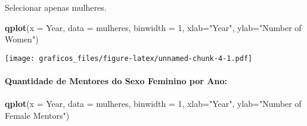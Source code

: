 \documentclass[
]{article}
\newenvironment{Shaded}{\begin{snugshade}}{\end{snugshade}}
\newcommand{\DataTypeTok}[1]{\textcolor[rgb]{0.13,0.29,0.53}{#1}}
\newcommand{\DecValTok}[1]{\textcolor[rgb]{0.00,0.00,0.81}{#1}}
\newcommand{\KeywordTok}[1]{\textcolor[rgb]{0.13,0.29,0.53}{\textbf{#1}}}
\newcommand{\NormalTok}[1]{#1}
\newcommand{\OperatorTok}[1]{\textcolor[rgb]{0.81,0.36,0.00}{\textbf{#1}}}
\newcommand{\StringTok}[1]{\textcolor[rgb]{0.31,0.60,0.02}{#1}}
\begin{document}
Selecionar apenas mulheres.

\begin{Shaded}
\end{Shaded}

\begin{Shaded}
\begin{Highlighting}[]
\KeywordTok{qplot}\NormalTok{(}\DataTypeTok{x =}\NormalTok{ Year, }\DataTypeTok{data =}\NormalTok{ mulheres, }\DataTypeTok{binwidth =} \DecValTok{1}\NormalTok{, }\DataTypeTok{xlab=}\StringTok{"Year"}\NormalTok{, }\DataTypeTok{ylab=}\StringTok{"Number of Women"}\NormalTok{) }
\end{Highlighting}
\end{Shaded}

\texttt{[image: graficos\_files/figure-latex/unnamed-chunk-4-1.pdf]}

\hypertarget{quantidade-de-mentores-do-sexo-feminino-por-ano}{%
\paragraph{Quantidade de Mentores do Sexo Feminino por
Ano:}\label{quantidade-de-mentores-do-sexo-feminino-por-ano}}

\begin{Shaded}
\end{Shaded}

\begin{Shaded}
\begin{Highlighting}[]
\KeywordTok{qplot}\NormalTok{(}\DataTypeTok{x =}\NormalTok{ Year, }\DataTypeTok{data =}\NormalTok{ mulheres, }\DataTypeTok{binwidth =} \DecValTok{1}\NormalTok{, }\DataTypeTok{xlab=}\StringTok{"Year"}\NormalTok{, }\DataTypeTok{ylab=}\StringTok{"Number of Female Mentors"}\NormalTok{)}
\end{Highlighting}
\end{Shaded}
\end{document}
